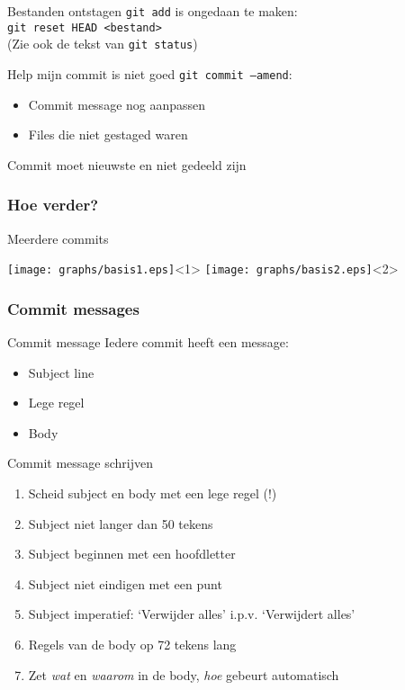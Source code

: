 \begin{frame}{Bestanden ontstagen}
	\texttt{git add} is ongedaan te maken:\\
	\texttt{git reset HEAD <bestand>}\\
	(Zie ook de tekst van \texttt{git status})
\end{frame}

\begin{frame}{Help mijn commit is niet goed}
	\texttt{git commit --amend}:
	\begin{itemize}
		\item Commit message nog aanpassen
		\item Files die niet gestaged waren
	\end{itemize}
	\alert{Commit moet nieuwste en niet gedeeld zijn}
\end{frame}

\subsubsection{Hoe verder?}
\begin{frame}{Meerdere commits}
	\begin{center}
		\texttt{[image: graphs/basis1.eps]}<1>
		\texttt{[image: graphs/basis2.eps]}<2>
	\end{center}
\end{frame}

\subsubsection{Commit messages}
\begin{frame}{Commit message}
	Iedere commit heeft een message:
	\begin{itemize}
		\item Subject line
		\item Lege regel
		\item Body
	\end{itemize}
\end{frame}

\begin{frame}{Commit message schrijven}
	\begin{enumerate}
		\item Scheid subject en body met een lege regel (!)
		\item Subject niet langer dan 50 tekens
		\item Subject beginnen met een hoofdletter
		\item Subject niet eindigen met een punt
		\item Subject imperatief: `Verwijder alles' i.p.v. `Verwijdert alles'
		\item Regels van de body op 72 tekens lang
		\item Zet \emph{wat} en \emph{waarom} in de body, \emph{hoe} gebeurt automatisch
	\end{enumerate}
\end{frame}

